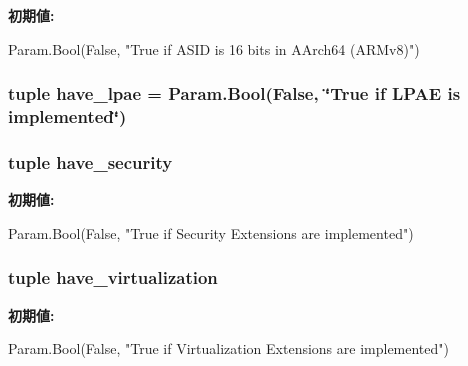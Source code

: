 \label{classArmSystem_1_1ArmSystem_a82887e1e3de3c3e0d28910b1604ab61a}
{\bfseries 初期値:}
\begin{DoxyCode}
Param.Bool(False,
        "True if ASID is 16 bits in AArch64 (ARMv8)")
\end{DoxyCode}
\hypertarget{classArmSystem_1_1ArmSystem_a2761f8fe489eb1f50380273e54f85b04}{
\subsubsection[{have\_\-lpae}]{\setlength{\rightskip}{0pt plus 5cm}tuple have\_\-lpae = Param.Bool(False, \char`\"{}True if LPAE is implemented\char`\"{})}}
\label{classArmSystem_1_1ArmSystem_a2761f8fe489eb1f50380273e54f85b04}
\hypertarget{classArmSystem_1_1ArmSystem_a6978e1e6ec4cd09819bff5ea47e48f73}{
\subsubsection[{have\_\-security}]{\setlength{\rightskip}{0pt plus 5cm}tuple have\_\-security}}
\label{classArmSystem_1_1ArmSystem_a6978e1e6ec4cd09819bff5ea47e48f73}
{\bfseries 初期値:}
\begin{DoxyCode}
Param.Bool(False,
        "True if Security Extensions are implemented")
\end{DoxyCode}
\hypertarget{classArmSystem_1_1ArmSystem_af99d2b8d0234cd2104e8e2cd8a592d7f}{
\subsubsection[{have\_\-virtualization}]{\setlength{\rightskip}{0pt plus 5cm}tuple have\_\-virtualization}}
\label{classArmSystem_1_1ArmSystem_af99d2b8d0234cd2104e8e2cd8a592d7f}
{\bfseries 初期値:}
\begin{DoxyCode}
Param.Bool(False,
        "True if Virtualization Extensions are implemented")
\end{DoxyCode}

